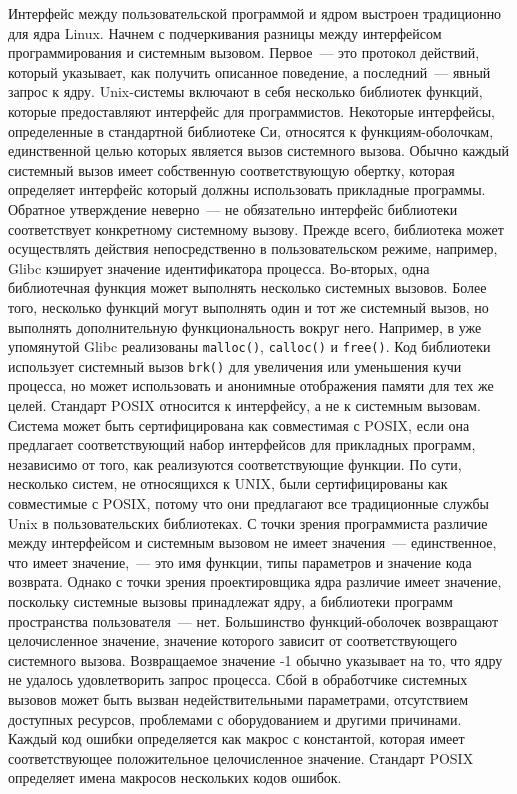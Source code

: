Интерфейс между пользовательской программой и ядром выстроен традиционно для
ядра Linux. Начнем с подчеркивания разницы между интерфейсом программирования и
системным вызовом. Первое~--- это протокол действий, который указывает, как
получить описанное поведение, а последний~--- явный запрос к ядру. Unix-системы
включают в себя несколько библиотек функций, которые предоставляют интерфейс для
программистов. Некоторые интерфейсы, определенные в стандартной библиотеке Си,
относятся к функциям-оболочкам, единственной целью которых является вызов
системного вызова. Обычно каждый системный вызов имеет собственную
соответствующую обертку, которая определяет интерфейс который должны
использовать прикладные программы. Обратное утверждение неверно~--- не
обязательно интерфейс библиотеки соответствует конкретному системному вызову.
Прежде всего, библиотека может осуществлять действия непосредственно в
пользовательском режиме, например, Glibc кэширует значение идентификатора
процесса. Во-вторых, одна библиотечная функция может выполнять несколько
системных вызовов. Более того, несколько функций могут выполнять один и тот же
системный вызов, но выполнять дополнительную функциональность вокруг него.
Например, в уже упомянутой Glibc реализованы  \texttt{malloc()},
\texttt{calloc()} и \texttt{free()}. Код библиотеки использует системный вызов
\texttt{brk()} для увеличения или уменьшения кучи процесса, но может
использовать и анонимные отображения памяти для тех же целей. Стандарт POSIX
относится к интерфейсу, а не к системным вызовам. Система может быть
сертифицирована как совместимая с POSIX, если она предлагает соответствующий
набор интерфейсов для прикладных программ, независимо от того, как реализуются
соответствующие функции. По сути, несколько систем, не относящихся к UNIX, были
сертифицированы как совместимые с POSIX, потому что они предлагают все
традиционные службы Unix в пользовательских библиотеках. С точки зрения
программиста различие между интерфейсом и системным вызовом не имеет
значения~--- единственное, что имеет значение,~---  это имя функции, типы
параметров и значение кода возврата. Однако с точки зрения проектировщика ядра
различие имеет значение, поскольку системные вызовы принадлежат ядру, а
библиотеки программ пространства пользователя~--- нет. Большинство
функций-оболочек возвращают целочисленное значение, значение которого зависит от
соответствующего системного вызова. Возвращаемое значение -1 обычно указывает на
то, что ядру не удалось удовлетворить запрос процесса. Сбой в обработчике
системных вызовов может быть вызван недействительными параметрами, отсутствием
доступных ресурсов, проблемами с оборудованием и другими причинами. Каждый код
ошибки определяется как макрос с константой, которая имеет соответствующее
положительное целочисленное значение. Стандарт POSIX определяет имена макросов
нескольких кодов ошибок.

